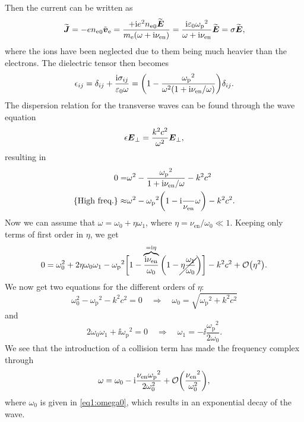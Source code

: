 \documentclass[11pt,a4paper, 
swedish, english %
]{article}
\newcommand{\enull}{\ensuremath{\varepsilon_{0}}}
\newcommand{\mee}{\ensuremath{m_{\text{e}}}}
\newcommand{\nee}{\ensuremath{{n_{\text{e}}}}}
\newcommand{\nuen}{\ensuremath{{\nu_{\text{en}}}}}
\newcommand{\wpe}{\ensuremath{{\omega_{\text{p}}}}}
\begin{document}
Then the current can be written as
\begin{equation}
\widetilde{\vb*J} = -e\nee_0\tilde{\vb*v}_\ee 
=\frac{+\ii e^2\nee_0 \widetilde{\vb*E}}{\mee(\omega + \ii\nuen)}
=\frac{\ii \enull\wpe^2}{\omega + \ii\nuen}\widetilde{\vb*E}
=\sigma\widetilde{\vb*E},
\end{equation}
where the ions have been neglected due to them being much heavier than
the electrons. The dielectric tensor then becomes
\begin{equation}
\epsilon_{ij}=\delta_{ij}+\frac{\ii \sigma_{ij}}{\enull\omega}
=\qty(1-\frac{\wpe^2}{\omega^2(1 + \ii\nuen/\omega)})\delta_{ij}.
\end{equation}
The dispersion relation for the transverse waves can be found through
the wave equation
\begin{equation}
\epsilon\vb*E_\perp = \frac{k^2c^2}{\omega^2}\vb*E_\perp,
\end{equation}
resulting in
\begin{equation}
\begin{aligned}
0=&\omega^2-\frac{\wpe^2}{1 + \ii\nuen/\omega}-k^2c^2\\
\qty{\text{High freq.}}\approx&
\omega^2-\wpe^2\qty(1-\ii\frac\nuen\omega)-k^2c^2.
\end{aligned}
\end{equation}
Now we can assume that $\omega=\omega_0+\eta\omega_1$, where
$\eta=\nuen/\omega_0\ll1$. Keeping only terms of first order
in $\eta$, we get
\begin{equation}
0=\omega_0^2+2\eta\omega_0\omega_1
-\wpe^2\bigg[1-
\overbrace{\frac{\ii\nuen}{\omega_0}}^{=\ii\eta}
\qty(1-\cancel{\eta\frac{\omega_1}{\omega_0}})\bigg]
-k^2c^2+\order{\eta^2}.
\end{equation}
We now get two equations for the different orders of $\eta$:
\begin{equation}\label{eq1:omega0}
\omega_0^2-\wpe^2-k^2c^2=0
\quad\Longrightarrow\quad
\omega_0=\sqrt{\wpe^2+k^2c^2}
\end{equation}
and
\begin{equation}
2\omega_0\omega_1 +\ii\wpe^2=0
\quad\Longrightarrow\quad
\omega_1=-\ii\frac{\wpe^2}{2\omega_0}.
\end{equation}
We see that the introduction of a collision term has made the
frequency complex through
\begin{equation}
\omega=\omega_0-\ii\frac{\nuen\wpe^2}{2\omega_0^2}
+\order{\frac{\nuen^2}{\omega_0^2}},
\end{equation}
where $\omega_0$ is given in \eqref{eq1:omega0}, which results in
an exponential decay of the wave. 
\end{document}

